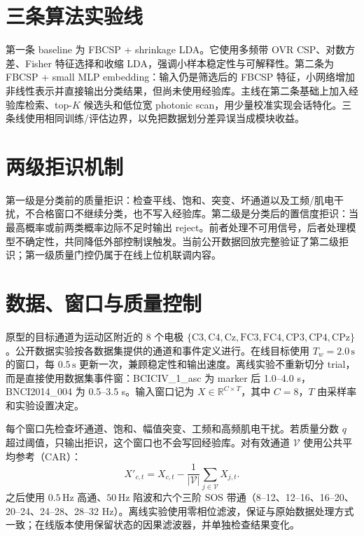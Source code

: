\documentclass[
    TwoSide=false,
    Degree=graduate,
    GradLevel=master,
    Type=thesis,
    Title={光电混合运动想象脑机接口技术文档}
]{zjuthesis}
\begin{document}
\section{三条算法实验线}
第一条 baseline 为 FBCSP + shrinkage LDA。它使用多频带 OVR CSP、对数方差、Fisher 特征选择和收缩 LDA，强调小样本稳定性与可解释性。第二条为 FBCSP + small MLP embedding：输入仍是筛选后的 FBCSP 特征，小网络增加非线性表示并直接输出分类结果，但尚未使用经验库。主线在第二条基础上加入经验库检索、top-$K$ 候选头和低位宽 photonic scan，用少量校准实现会话特化。三条线使用相同训练/评估边界，以免把数据划分差异误当成模块收益。

\section{两级拒识机制}
第一级是分类前的质量拒识：检查平线、饱和、突变、坏通道以及工频/肌电干扰，不合格窗口不继续分类，也不写入经验库。第二级是分类后的置信度拒识：当最高概率或前两类概率边际不足时输出 reject。前者处理不可用信号，后者处理模型不确定性，共同降低外部控制误触发。当前公开数据回放完整验证了第二级拒识；第一级质量门控仍属于在线上位机联调内容。

\section{数据、窗口与质量控制}
原型的目标通道为运动区附近的 8 个电极 $\{\mathrm{C3,C4,Cz,FC3,FC4,CP3,CP4,CPz}\}$。公开数据实验按各数据集提供的通道和事件定义进行。在线目标使用 $T_w=2.0\,\mathrm{s}$ 的窗口，每 $0.5\,\mathrm{s}$ 更新一次，兼顾稳定性和输出速度。离线实验不重新切分 trial，而是直接使用数据集事件窗：BCICIV\_1\_asc 为 marker 后 1.0--4.0 s，BNCI2014\_004 为 0.5--3.5 s。输入窗口记为 $X\in\mathbb{R}^{C\times T}$，其中 $C=8$，$T$ 由采样率和实验设置决定。

每个窗口先检查坏通道、饱和、幅值突变、工频和高频肌电干扰。若质量分数 $q$ 超过阈值，只输出拒识，这个窗口也不会写回经验库。对有效通道 $\mathcal{V}$ 使用公共平均参考（CAR）：
\begin{equation}\label{eq:car}
X'_{c,t}=X_{c,t}-\frac{1}{|\mathcal{V}|}\sum_{j\in\mathcal{V}}X_{j,t}.
\end{equation}
之后使用 $0.5\,\mathrm{Hz}$ 高通、$50\,\mathrm{Hz}$ 陷波和六个三阶 SOS 带通（8--12、12--16、16--20、20--24、24--28、28--32 Hz）。离线实验使用零相位滤波，保证与原始数据处理方式一致；在线版本使用保留状态的因果滤波器，并单独检查结果变化。
\end{document}
